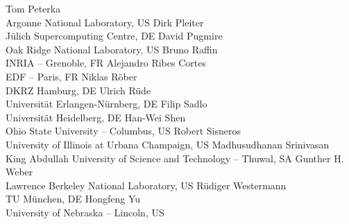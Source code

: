 \documentclass[a4paper,UKenglish]{dagrep}
\begin{document}
\begin{participants}
\participant Tom Peterka \\ Argonne National Laboratory, US
\participant Dirk Pleiter \\ Jülich Supercomputing Centre, DE
\participant David Pugmire \\ Oak Ridge National Laboratory, US
\participant Bruno Raffin \\ INRIA – Grenoble, FR
\participant Alejandro Ribes Cortes \\ EDF – Paris, FR
\participant Niklas Röber \\ DKRZ Hamburg, DE
\participant Ulrich Rüde \\ Universität Erlangen-Nürnberg, DE
\participant Filip Sadlo \\ Universität Heidelberg, DE
\participant Han-Wei Shen \\ Ohio State University – Columbus, US
\participant Robert Sisneros \\ University of Illinois at Urbana Champaign, US
\participant Madhusudhanan Srinivasan \\ King Abdullah University of Science and Technology – Thuwal, SA
\participant Gunther H. Weber \\ Lawrence Berkeley National Laboratory, US
\participant Rüdiger Westermann \\ TU München, DE
\participant Hongfeng Yu \\ University of Nebraska – Lincoln, US
\end{participants}
\end{document}
